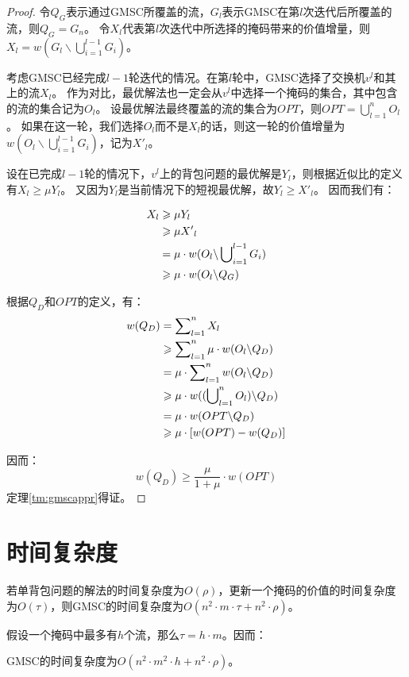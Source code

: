 \begin{proof}
令$Q_G$表示通过GMSC所覆盖的流，$G_l$表示GMSC在第$l$次迭代后所覆盖的流，则$Q_G = G_n$。
令$X_l$代表第$l$次迭代中所选择的掩码带来的价值增量，则$X_l =w(G_l \backslash \bigcup\nolimits^{l-1}_{i=1}G_i)$。

考虑GMSC已经完成$l-1$轮迭代的情况。在第$l$轮中，GMSC选择了交换机$v^l$和其上的流$X_l$。
作为对比，最优解法也一定会从$v^l$中选择一个掩码的集合，其中包含的流的集合记为$O_l$。
设最优解法最终覆盖的流的集合为$OPT$，则$OPT = \bigcup\nolimits_{l=1}^{n}O_l$。
如果在这一轮，我们选择$O_l$而不是$X_l$的话，则这一轮的价值增量为$w(O_l \backslash \bigcup\nolimits^{l-1}_{i=1}G_i)$，记为${X'}_l$。

设在已完成$l-1$轮的情况下，$v^l$上的背包问题的最优解是$Y_l$，则根据近似比的定义有$X_l \ge \mu Y_l$。
又因为$Y_l$是当前情况下的短视最优解，故$Y_l \ge {X'}_l$。
因而我们有：

\begin{align}
    X_l &\ge \mu Y_l \notag\\
        &\ge \mu {X'}_l \notag\\
        &= \mu \cdot w(O_l \backslash \bigcup\nolimits^{l-1}_{i=1}G_i) \notag\\
        &\ge \mu \cdot w(O_l \backslash Q_G) \notag
\end{align}

根据$Q_D$和$OPT$的定义，有：
\begin{align}
    w(Q_D)&=\sum\nolimits_{l=1}^{n} X_l \notag\\
        &\ge \sum\nolimits_{l=1}^{n} \mu \cdot w(O_l \backslash Q_D) \notag\\
        &=  \mu \cdot \sum\nolimits_{l=1}^{n} w(O_l \backslash Q_D) \notag\\
        &\ge \mu \cdot w ((\bigcup\nolimits_{l=1}^{n}O_l) \backslash Q_D) \notag\\
        &=  \mu \cdot w( OPT \backslash Q_D) \notag\\
        &\ge \mu \cdot [ w(OPT)-w(Q_D)] \notag
\end{align}

因而：
\begin{equation}\label{eq:gmscappr}
    w(Q_D) \ge \frac{\mu }{1+\mu} \cdot w(OPT)
\end{equation}
定理\ref{tm:gmscappr}得证。
\end{proof}

\section{时间复杂度}
若单背包问题的解法的时间复杂度为$O(\rho)$，更新一个掩码的价值的时间复杂度为$O(\tau)$，则GMSC的时间复杂度为$O(n^2\cdot m \cdot \tau + n^2 \cdot \rho)$。

假设一个掩码中最多有$h$个流，那么$\tau = h\cdot m$。因而：

\begin{theorem}\label{tm:gmsctime}
    GMSC的时间复杂度为$O(n^2\cdot m^2 \cdot h+ n^2 \cdot \rho)$。
\end{theorem}